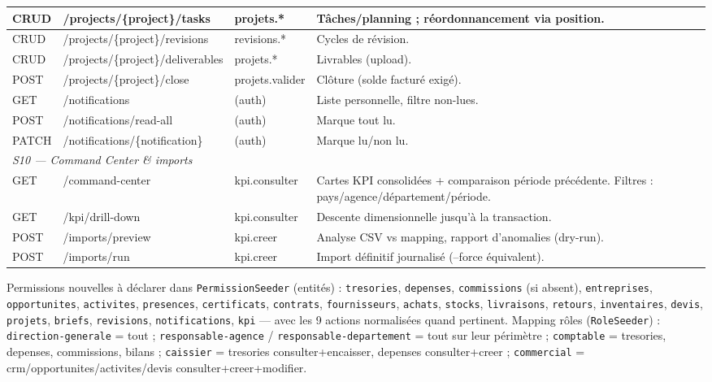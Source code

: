 \documentclass[11pt,a4paper]{article}
\begin{document}
\begin{longtable}{|p{1.3cm}|p{4.6cm}|p{2.7cm}|p{6.8cm}|}
CRUD & /projects/\{project\}/tasks & projets.* & Tâches/planning ; réordonnancement via position. \\ \hline
CRUD & /projects/\{project\}/revisions & revisions.* & Cycles de révision. \\ \hline
CRUD & /projects/\{project\}/deliverables & projets.* & Livrables (upload). \\ \hline
POST & /projects/\{project\}/close & projets.valider & Clôture (solde facturé exigé). \\ \hline
GET & /notifications & (auth) & Liste personnelle, filtre non-lues. \\ \hline
POST & /notifications/read-all & (auth) & Marque tout lu. \\ \hline
PATCH & /notifications/\{notification\} & (auth) & Marque lu/non lu. \\ \hline
\multicolumn{4}{|l|}{\cellcolor{peklight}\textit{S10 --- Command Center \& imports}} \\ \hline
GET & /command-center & kpi.consulter & Cartes KPI consolidées + comparaison période précédente. Filtres : pays/agence/département/période. \\ \hline
GET & /kpi/drill-down & kpi.consulter & Descente dimensionnelle jusqu'à la transaction. \\ \hline
POST & /imports/preview & kpi.creer & Analyse CSV vs mapping, rapport d'anomalies (dry-run). \\ \hline
POST & /imports/run & kpi.creer & Import définitif journalisé (--force équivalent). \\ \hline
\end{longtable}

Permissions nouvelles à déclarer dans \verb|PermissionSeeder| (entités) : \verb|tresories|, \verb|depenses|, \verb|commissions| (si absent), \verb|entreprises|, \verb|opportunites|, \verb|activites|, \verb|presences|, \verb|certificats|, \verb|contrats|, \verb|fournisseurs|, \verb|achats|, \verb|stocks|, \verb|livraisons|, \verb|retours|, \verb|inventaires|, \verb|devis|, \verb|projets|, \verb|briefs|, \verb|revisions|, \verb|notifications|, \verb|kpi| --- avec les 9 actions normalisées quand pertinent. Mapping rôles (\verb|RoleSeeder|) : \verb|direction-generale| = tout ; \verb|responsable-agence| / \verb|responsable-departement| = tout sur leur périmètre ; \verb|comptable| = tresories, depenses, commissions, bilans ; \verb|caissier| = tresories consulter+encaisser, depenses consulter+creer ; \verb|commercial| = crm/opportunites/activites/devis consulter+creer+modifier.
\end{document}
